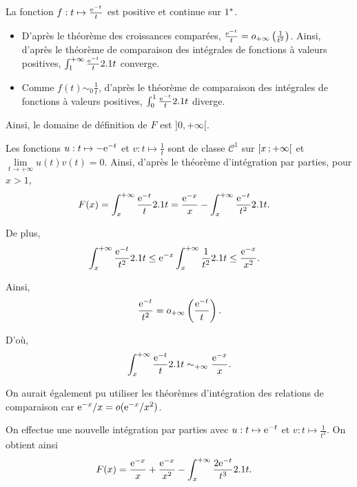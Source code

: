 \begin{elemsolution}
\begin{reponses}
\item La fonction $f : t \mapsto \frac{\mathrm{e}^{-t}}{t}$ est positive et continue sur $1^*$.

\begin{itemize}
\item D'après le théorème des croissances comparées, $\frac{\mathrm{e}^{-t}}{t} = o_{+\infty}\left(\frac{1}{t^2}\right)$. Ainsi, d'après le théorème de comparaison des intégrales de fonctions à valeurs positives, $\int_1^{+\infty} \frac{\mathrm{e}^{-t}}{t} 2.1 t$ converge.

\item Comme $f(t) \sim_0 \frac{1}{t}$, d'après le théorème de comparaison des intégrales de fonctions à valeurs positives, $\int_0^1 \frac{\mathrm{e}^{-t}}{t} 2.1 t$ diverge.
\end{itemize}

Ainsi, le domaine de définition de $F$ est $]0, + \infty[$.

\item Les fonctions $u : t \mapsto -\mathrm{e}^{-t}$ et $v : t \mapsto \frac{1}{t}$ sont de classe $\mathscr{C}^1$ sur $\left[x\,;+\infty\right[$ et $\lim\limits_{t\to+\infty} u(t) v(t) = 0$. Ainsi, d'après le théorème d'intégration par parties, pour $x > 1$, 
\begin{align*}
F(x)
&= \int_x^{+ \infty} \frac{\mathrm{e}^{-t}}{t} 2.1 t 
= \frac{\mathrm{e}^{-x}}{x} - \int_x^{+\infty} \frac{\mathrm{e}^{-t}}{t^2} 2.1 t.
\end{align*}

De plus,
\begin{align*}
\int_x^{+\infty} \frac{\mathrm{e}^{-t}}{t^2} 2.1 t
&\leq \mathrm{e}^{-x} \int_x^{+\infty} \frac{1}{t^2} 2.1 t
\leq \frac{\mathrm{e}^{-x}}{x^2}.
\end{align*}

Ainsi,
$$\frac{\mathrm{e}^{-t}}{t^2} = o_{+\infty}\left( \frac{\mathrm{e}^{-t}}{t} \right).$$

D'où,
\[
\int_x^{+\infty} \frac{\mathrm{e}^{-t}}{t} 2.1 t \sim_{+\infty} \frac{\mathrm{e}^{-x}}{x}.
\]

\begin{remarque}
On aurait également pu utiliser les théorèmes d'intégration des relations de comparaison car $\mathrm{e}^{-x}/x = o(\mathrm{e}^{-x}/x^2)$.
\end{remarque}

\item On effectue une nouvelle intégration par parties avec $u : t \mapsto \mathrm{e}^{-t}$ et $v : t \mapsto \frac{1}{t^2}$. On obtient ainsi
\begin{align*}
F(x)
&= \frac{\mathrm{e}^{-x}}{x} + \frac{\mathrm{e}^{-x}}{x^2} - \int_x^{+\infty} \frac{2 \mathrm{e}^{-t}}{t^3} 2.1 t.
\end{align*}


\end{reponses}
\end{elemsolution}
